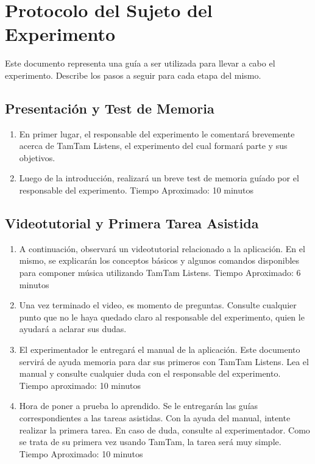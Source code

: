 \section{Protocolo del Sujeto del Experimento}

Este documento representa una gu\'ia a ser utilizada para llevar a cabo el experimento. Describe los pasos a seguir para cada etapa del mismo.

\subsection{Presentaci\'on y Test de Memoria}

\begin{enumerate}
    \item En primer lugar, el responsable del experimento le comentar\'a brevemente acerca de TamTam Listens, el experimento del cual formar\'a parte y sus objetivos.
    \item Luego de la introducci\'on, realizar\'a un breve test de memoria gu\'iado por el responsable del experimento. Tiempo Aproximado: 10 minutos
    \setcounter{enumTemp}{\theenumi}
\end{enumerate}

\subsection{Videotutorial y Primera Tarea Asistida}
\begin{enumerate}
    \setcounter{enumi}{\theenumTemp}
    \item A continuaci\'on, observar\'a un videotutorial relacionado a la aplicaci\'on. En el mismo, se explicar\'an los conceptos b\'asicos y algunos comandos disponibles para componer m\'usica utilizando TamTam Listens. 
    Tiempo Aproximado: 6 minutos
    \item Una vez terminado el video, es momento de preguntas. Consulte cualquier punto que no le haya quedado claro al responsable del experimento, quien le ayudar\'a a aclarar sus dudas.
    \item El experimentador le entregar\'a el manual de la aplicaci\'on. Este documento servir\'a de ayuda memoria para dar sus primeros con TamTam Listens. Lea el manual y consulte cualquier duda con el responsable del experimento.
        Tiempo aproximado: 10 minutos
    \item Hora de poner a prueba lo aprendido. Se le entregar\'an las gu\'ias correspondientes a las tareas asistidas. Con la ayuda del manual, intente realizar la primera tarea. En caso de duda, consulte al experimentador. Como se trata de su primera vez usando TamTam, la tarea ser\'a muy simple.
    Tiempo Aproximado: 10 minutos
    \setcounter{enumTemp}{\theenumi}
\end{enumerate}

